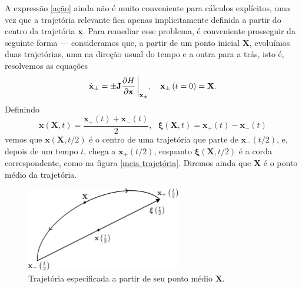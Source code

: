 \documentclass[
	12pt,
	oneside,			%
	a4paper,			%
	english,			%
	brazil				%
	]{abntex2}
\theoremstyle{definition}
\begin{document}
A expressão \eqref{ação} ainda não é muito conveniente para cálculos explícitos, uma vez que a trajetória relevante fica apenas implicitamente definida a partir do centro da trajetória $\mathbf{x}$. Para remediar esse problema, é conveniente prosseguir da seguinte forma — consideramos que, a partir de um ponto inicial $\mathbf{X}$, evoluímos duas trajetórias, uma na direção usual do tempo e a outra para a trás, isto é, resolvemos as equações
\begin{equation}
\label{não sei dar nomeee}
   \dot{\mathbf{x}}_{\pm} = \pm \mathbf{J} \frac{\partial H}{\partial \mathbf{x}} \eval_{ \mathbf{x}_{\pm} }, \ \ \ \mathbf{x}_{\pm} \left( t = 0 \right) = \mathbf{X}.
\end{equation}
Definindo
\begin{equation}
\label{problema valor inicial}
    \mathbf{x}(\mathbf{X},t) = \frac{\mathbf{x}_{+}(t)+\mathbf{x}_{-}(t)}{2}, \ \ \ \boldsymbol{\xi}(\mathbf{X},t) = \mathbf{x}_{+}(t)-\mathbf{x}_{-}(t)
\end{equation}
vemos que $\mathbf{x}\left( \mathbf{X},t/2\right)$ é o centro de uma trajetória que parte de $\mathbf{x}_{-}(t/2)$, e, depois de um tempo $t$, chega a $\mathbf{x}_{+}(t/2)$, enquanto $\boldsymbol{\xi}\left( \mathbf{X},t/2\right)$ é a corda correspondente, como na figura \eqref{meia trajetória}. Diremos ainda que $\mathbf{X}$ é o ponto médio da trajetória.

\begin{figure}[H]
    \includegraphics[width=0.6\textwidth]{Imagens/half_trajectories.png}
    \centering
    \caption{Trajetória especificada a partir de seu ponto médio $\mathbf{X}$.}
    \label{meia trajetória}
\end{figure}
\end{document}
